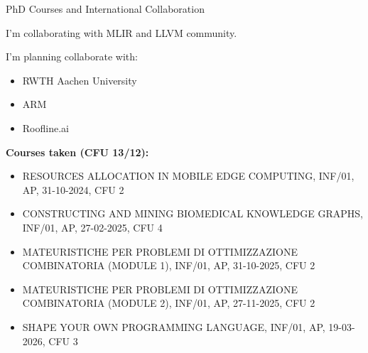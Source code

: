 \documentclass[
	aspectratio=169, %
]{beamer}
\begin{document}
\begin{frame}{PhD Courses and International  Collaboration}
\tiny

I'm collaborating with MLIR and LLVM community.

I'm planning collaborate with:
\begin{itemize}
   \item[\dingblue{43}] RWTH Aachen University
   \item[\dingblue{43}] ARM
   \item[\dingblue{43}] Roofline.ai
\end{itemize}

\textbf{Courses taken (CFU 13/12):}

\begin{itemize}
   \item[\dingblue{43}] RESOURCES ALLOCATION IN MOBILE EDGE COMPUTING, INF/01, AP, 31-10-2024, CFU 2
   \item[\dingblue{43}] CONSTRUCTING AND MINING BIOMEDICAL KNOWLEDGE GRAPHS, INF/01, AP, 27-02-2025, CFU 4
   \item[\dingblue{43}] MATEURISTICHE PER PROBLEMI DI OTTIMIZZAZIONE COMBINATORIA (MODULE 1), INF/01, AP, 31-10-2025, CFU 2
   \item[\dingblue{43}] MATEURISTICHE PER PROBLEMI DI OTTIMIZZAZIONE COMBINATORIA (MODULE 2), INF/01, AP, 27-11-2025, CFU 2
   \item[\dingblue{43}] SHAPE YOUR OWN PROGRAMMING LANGUAGE, INF/01, AP, 19-03-2026, CFU 3
\end{itemize}





\end{frame}
\end{document}
